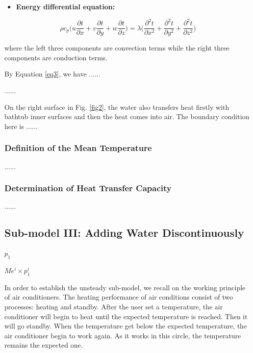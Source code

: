 \documentclass{mcmthesis}
\begin{document}
\begin{itemize}
\item {\bf Energy differential equation:}
\end{itemize}

\begin{equation} \label{eq3}
\rho c_p \Big( u\frac{\partial t}{\partial x} + v\frac{\partial t}{\partial y} + w\frac{\partial t}{\partial z} \Big) = \lambda \Big(\frac{\partial^2 t}{\partial x^2} + \frac{\partial^2 t}{\partial y^2} + \frac{\partial^2 t}{\partial z^2} \Big)
\end{equation}

\noindent where the left three components are convection terms while the right three components are conduction terms.

By Equation \eqref{eq3}, we have ......

......

On the right surface in Fig. \ref{fig2}, the water also transfers heat firstly with bathtub inner surfaces and then the heat comes into air. The boundary condition here is ......

\subsubsection{Definition of the Mean Temperature}

......

\subsubsection{Determination of Heat Transfer Capacity}

......

\subsection{Sub-model III: Adding Water Discontinuously}

$p_{1}$

$Me^{i}\times p_{1}^{i}$

In order to establish the unsteady sub-model, we recall on the working principle of air conditioners. The heating performance of air conditions consist of two processes: heating and standby. After the user set a temperature, the air conditioner will begin to heat until the expected temperature is reached. Then it will go standby. When the temperature get below the expected temperature, the air conditioner begin to work again. As it works in this circle, the temperature remains the expected one.
\end{document}

